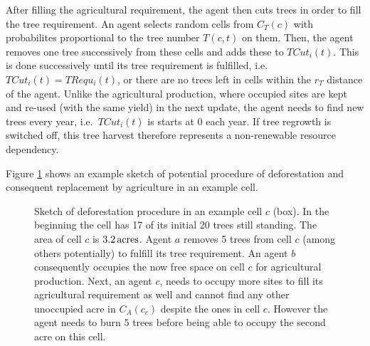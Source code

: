 After filling the agricultural requirement, the agent then cuts trees in order to fill the tree requirement. 
An agent selects random cells from $C_T(c)$ with probabilites proportional to the tree number $T(c,t)$ on them.
Then, the agent removes one tree successively from these cells and adds these to $TCut_i(t)$.
This is done successively until its tree requirement is fulfilled, i.e.\ $TCut_i(t)=TRequ_i(t)$, or there are no trees left in cells within the $r_T$ distance of the agent.
Unlike the agricultural production, where occupied sites are kept and re-used (with the same yield) in the next update, the agent needs to find new trees every year, i.e.\ $TCut_i(t)$ is starts at $0$ each year.
If tree regrowth is switched off, this tree harvest therefore represents a non-renewable resource dependency.

Figure \TODO \ref{fig:treeburning} shows an example sketch of potential procedure of deforestation and consequent replacement by agriculture in an example cell. 

\begin{figure}
	\centering
	\caption{Sketch of deforestation procedure in an example cell $c$ (box). 
		In the beginning the cell has 17 of its initial 20 trees still standing. 
		The area of cell $c$ is $3.2\, \rm{acres}$. 
		Agent $a$ removes 5 trees from cell $c$ (among others potentially) to fulfill its tree requirement. An agent $b$ consequently occupies the now free space on cell $c$ for agricultural production. 
		Next, an agent $c$, needs to occupy more sites to fill its agricultural requirement as well and cannot find any other unoccupied acre in $C_A(c_c)$ despite the ones in cell $c$. 
		However the agent needs to burn $5$ trees before being able to occupy the second acre on this cell.}
	\label{fig:treeburning}
\end{figure}

